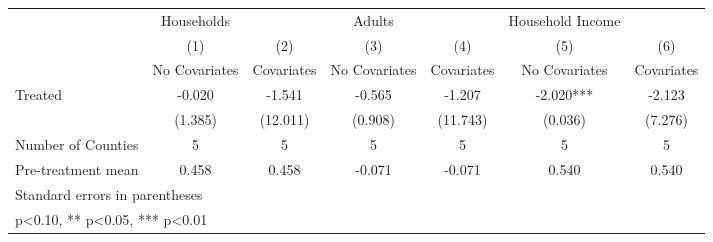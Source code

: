 {
\def\sym#1{\ifmmode^{#1}\else\(^{#1}\)\fi}
\begin{tabular}{l*{6}{c}}
\hline\hline
            &  Households   &               &      Adults   &               &Household Income   &               \\
            &\multicolumn{1}{c}{(1)}&\multicolumn{1}{c}{(2)}&\multicolumn{1}{c}{(3)}&\multicolumn{1}{c}{(4)}&\multicolumn{1}{c}{(5)}&\multicolumn{1}{c}{(6)}\\
            &\multicolumn{1}{c}{No Covariates}&\multicolumn{1}{c}{Covariates}&\multicolumn{1}{c}{No Covariates}&\multicolumn{1}{c}{Covariates}&\multicolumn{1}{c}{No Covariates}&\multicolumn{1}{c}{Covariates}\\
\hline
Treated     &      -0.020   &      -1.541   &      -0.565   &      -1.207   &      -2.020***&      -2.123   \\
            &     (1.385)   &    (12.011)   &     (0.908)   &    (11.743)   &     (0.036)   &     (7.276)   \\
\hline
Number of Counties&           5   &           5   &           5   &           5   &           5   &           5   \\
Pre-treatment mean&       0.458   &       0.458   &      -0.071   &      -0.071   &       0.540   &       0.540   \\
\hline\hline
\multicolumn{7}{l}{\footnotesize Standard errors in parentheses}\\
\multicolumn{7}{l}{\footnotesize * p<0.10, ** p<0.05, *** p<0.01}\\
\end{tabular}
}
